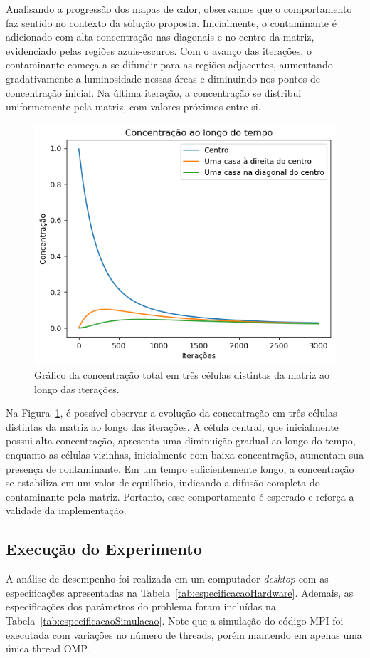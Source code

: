 \documentclass[12pt]{article}
\begin{document}
Analisando a progressão dos mapas de calor, observamos que o comportamento faz
sentido no contexto da solução proposta. Inicialmente, o contaminante é
adicionado com alta concentração nas diagonais e no centro da matriz,
evidenciado pelas regiões azuis-escuros. Com o avanço das iterações, o
contaminante começa a se difundir para as regiões adjacentes, aumentando
gradativamente a luminosidade nessas áreas e diminuindo nos pontos de
concentração inicial. Na última iteração, a concentração se distribui
uniformemente pela matriz, com valores próximos entre si.

\begin{figure}[ht]
  \centering
  \includegraphics[width=.45\textwidth]{figs/concentrationxiteration.png}
  \caption{Gráfico da concentração total em três células distintas da matriz ao longo das iterações.}\label{fig:concentracaoXiteracao}
\end{figure}

Na Figura~\ref{fig:concentracaoXiteracao}, é possível observar a evolução da
concentração em três células distintas da matriz ao longo das iterações. A
célula central, que inicialmente possui alta concentração, apresenta uma
diminuição gradual ao longo do tempo, enquanto as células vizinhas,
inicialmente com baixa concentração, aumentam sua presença de contaminante. Em
um tempo suficientemente longo, a concentração se estabiliza em um valor de
equilíbrio, indicando a difusão completa do contaminante pela matriz. Portanto,
esse comportamento é esperado e reforça a validade da implementação.

\subsection{Execução do Experimento}

A análise de desempenho foi realizada em um computador \textit{desktop} com as
especificações apresentadas na Tabela~\ref{tab:especificacaoHardware}. Ademais,
as especificações dos parâmetros do problema foram incluídas na
Tabela~\ref{tab:especificacaoSimulacao}. Note que a simulação do código MPI foi
executada com variações no número de threads, porém mantendo em apenas uma
única thread OMP.
\end{document}
